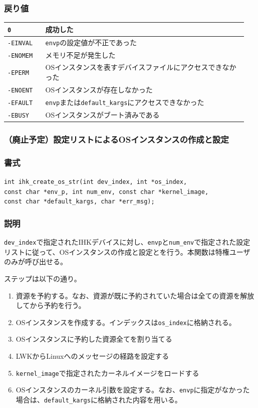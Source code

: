 \documentclass[twoside,11pt,fleqn]{book}
\begin{document}
\subsubsection*{戻り値}
\begin{table}[!h]
\footnotesize
\begin{tabular}{|p{0.15\linewidth}|p{0.80\linewidth}|} \hline
\verb:0:&	成功した\\ \hline
\verb:-EINVAL:&	\verb:envp:の設定値が不正であった\\ \hline
\verb:-ENOMEM:&	メモリ不足が発生した\\ \hline
\verb:-EPERM:&	OSインスタンスを表すデバイスファイルにアクセスできなかった\\ \hline
\verb:-ENOENT:&	OSインスタンスが存在しなかった\\ \hline
\verb:-EFAULT:&	\verb:envp:または\verb:default_kargs:にアクセスできなかった\\ \hline
\verb:-EBUSY:&OSインスタンスがブート済みである\\ \hline
\end{tabular}
\vspace{-0em}
\end{table}
\FloatBarrier

\subsubsection{（廃止予定）設定リストによるOSインスタンスの作成と設定}
\subsubsection*{書式}{\quad} \verb:int ihk_create_os_str(int dev_index, int *os_index,:\\{\quad}{\quad}
\verb:const char *env_p, int num_env, const char *kernel_image,:\\{\quad}{\quad}
\verb:const char *default_kargs, char *err_msg);:
\subsubsection*{説明}{\quad} \verb:dev_index:で指定されたIHKデバイスに対し、\verb:envp:と\verb:num_env:で指定された設定リストに従って、OSインスタンスの作成と設定とを行う。本関数は特権ユーザのみが呼び出せる。

ステップは以下の通り。
\begin{enumerate}
\item 資源を予約する。なお、資源が既に予約されていた場合は全ての資源を解放してから予約を行う。
\item OSインスタンスを作成する。インデックスは\verb:os_index:に格納される。
\item OSインスタンスに予約した資源全てを割り当てる
\item LWKからLinuxへのメッセージの経路を設定する
\item \verb:kernel_image:で指定されたカーネルイメージをロードする
\item OSインスタンスのカーネル引数を設定する。なお、\verb:envp:に指定がなかった場合は、\verb:default_kargs:に格納された内容を用いる。
\end{enumerate}
\end{document}
